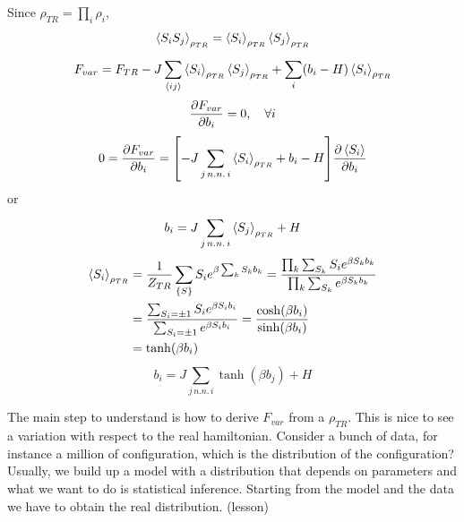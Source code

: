\documentclass[../main/main.tex]{subfiles}
\begin{document}
Since \( \rho _{TR} = \prod_{i}^{} \rho _i  \),
\begin{equation}
  \expval{S_i S_j}_{\rho _{TR}}  = \expval{S_i}_{\rho _{TR}}  \expval{S_j}_{\rho _{TR}}
\end{equation}
\begin{equation}
  F_{var} = F_{TR} - J \sum_{\expval{ij} }^{} \expval{S_i}_{\rho _{TR}}  \expval{S_j}_{\rho _{TR}}  + \sum_{i}^{} (b_i - H) \expval{S_i}_{\rho _{TR}}
\end{equation}
\begin{equation}
  \pdv{F_{var}}{b_i} = 0, \quad \forall i
\end{equation}
\begin{equation}
  0 = \pdv{F_{var}}{b_i} = \qty[-J \sum_{j \, n.n. \, i}^{} \expval{S_i}_{\rho _{TR}}  + b_i - H  ] \pdv{\expval{S_i} }{b_i}
\end{equation}
or
\begin{equation}
  b_i = J \sum_{j \, n.n. \, i}^{} \expval{S_j}_{\rho _{TR}} + H
\end{equation}
\begin{equation}
\begin{split}
\expval{S_i}_{\rho _{TR}}    &= \frac{1}{Z_{TR}} \sum_{\{ S \}  }^{} S_i e^{\beta \sum_{k}^{} S_k b_k } = \frac{\prod_{k}^{}  \sum_{S_k}^{} S_i e^{\beta S_k b_k}   }{\prod_{k}^{} \sum_{S_k}^{} e^{\beta S_k b_k}    }  \\
& = \frac{\sum_{S_i = \pm 1}^{} S_i e^{\beta S_i b_i}  }{\sum_{S_i = \pm 1}^{} e^{\beta S_i b_i}   } = \frac{\cosh (\beta b_i)}{\sinh (\beta b_i)} \\
&= \tanh (\beta b_i)
\end{split}
\end{equation}
\begin{equation}
  b_i = J \sum_{j \, n.n. \, i}^{} \tanh (\beta b_j) + H
\end{equation}
\begin{remark}
The main step to understand is how to derive \( F_{var} \) from a \( \rho _{TR} \).
This is nice to see a variation with respect to the real hamiltonian.
Consider a bunch of data, for instance a million of configuration, which is the distribution of the configuration? Usually, we build up a model with a distribution that depends on parameters and what we want to do is statistical inference. Starting from the model and the data we have to obtain the real distribution. (lesson)
\end{remark}
\end{document}
